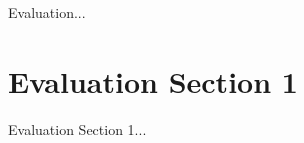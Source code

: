 \label{sec:4}

Evaluation...

\section{Evaluation Section 1}
\label{sec:4.1}

Evaluation Section 1... 
